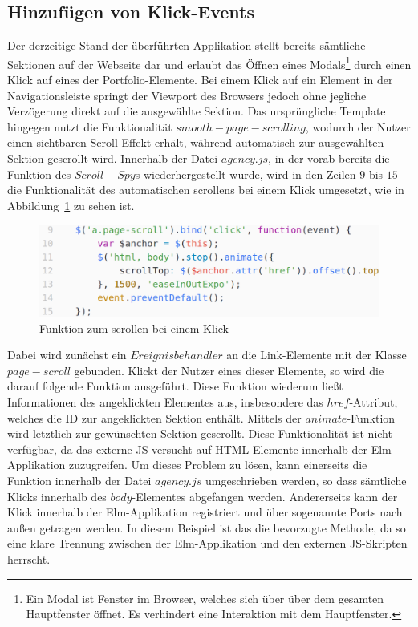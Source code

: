 \subsection{Hinzufügen von Klick-Events}
\label{sec:erweiterung-clicks}
Der derzeitige Stand der überführten Applikation stellt bereits sämtliche Sektionen auf der Webseite dar und erlaubt das Öffnen eines Modals\footnote{Ein Modal ist Fenster im Browser, welches sich über  über dem gesamten Hauptfenster öffnet. Es verhindert eine Interaktion mit dem Hauptfenster.} durch einen Klick auf eines der Portfolio-Elemente. Bei einem Klick auf ein Element in der Navigationsleiste springt der Viewport des Browsers jedoch ohne jegliche Verzögerung direkt auf die ausgewählte Sektion. Das ursprüngliche Template hingegen nutzt die Funktionalität $smooth-page-scrolling$, wodurch der Nutzer einen sichtbaren Scroll-Effekt erhält, während automatisch zur ausgewählten Sektion gescrollt wird. Innerhalb der Datei $agency.js$, in der vorab bereits die Funktion des $Scroll-Spy$s wiederhergestellt wurde, wird in den Zeilen $9$ bis $15$ die Funktionalität des automatischen scrollens bei einem Klick umgesetzt, wie in Abbildung~\ref{fig:non-functional-scrolling} zu sehen ist.
\begin{figure}[h]
\centering
\includegraphics[scale=0.37]{img/non-functional-scrolling}
\caption{Funktion zum scrollen bei einem Klick}\label{fig:non-functional-scrolling}
\end{figure}
Dabei wird zunächst ein $Ereignisbehandler$ an die Link-Elemente mit der Klasse $page-scroll$ gebunden. Klickt der Nutzer eines dieser Elemente, so wird die darauf folgende Funktion ausgeführt. Diese Funktion wiederum ließt Informationen des angeklickten Elementes aus, insbesondere das $href$-Attribut, welches die \ac{ID} zur angeklickten Sektion enthält. Mittels der $animate$-Funktion wird letztlich zur gewünschten Sektion gescrollt.
Diese Funktionalität ist nicht verfügbar, da das externe \ac{JS} versucht auf \ac{HTML}-Elemente innerhalb der Elm-Applikation zuzugreifen. Um dieses Problem zu lösen, kann einerseits die Funktion innerhalb der Datei $agency.js$ umgeschrieben werden, so dass sämtliche Klicks innerhalb des $body$-Elementes abgefangen werden. Andererseits kann der Klick innerhalb der Elm-Applikation registriert und über sogenannte Ports nach außen getragen werden. In diesem Beispiel ist das die bevorzugte Methode, da so eine klare Trennung zwischen der Elm-Applikation und den externen \ac{JS}-Skripten herrscht.
